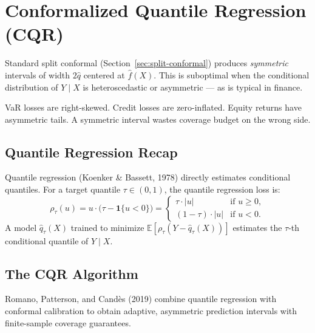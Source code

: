 \documentclass[11pt, a4paper]{article}
\theoremstyle{definition}
\theoremstyle{plain}
\theoremstyle{remark}
\newcommand{\EV}{\mathbb{E}}
\newcommand{\ind}{\boldsymbol{1}}
\begin{document}
\section{Conformalized Quantile Regression (CQR)}
\label{sec:cqr}

Standard split conformal (Section~\ref{sec:split-conformal}) produces
\emph{symmetric} intervals of width $2\hat{q}$ centered at $\hat{f}(X)$.
This is suboptimal when the conditional distribution of $Y \mid X$ is
heteroscedastic or asymmetric --- as is typical in finance.

VaR losses are right-skewed.
Credit losses are zero-inflated.
Equity returns have asymmetric tails.
A symmetric interval wastes coverage budget on the wrong side.

\subsection{Quantile Regression Recap}

Quantile regression (Koenker \& Bassett, 1978) directly estimates conditional
quantiles.
For a target quantile $\tau \in (0,1)$, the quantile regression loss is:
\begin{equation}\label{eq:pinball-loss}
    \rho_\tau(u) = u \cdot \bigl(\tau - \ind\{u < 0\}\bigr)
    = \begin{cases}
        \tau \cdot |u| & \text{if } u \geq 0, \\
        (1 - \tau) \cdot |u| & \text{if } u < 0.
    \end{cases}
\end{equation}
A model $\hat{q}_\tau(X)$ trained to minimize $\EV[\rho_\tau(Y - \hat{q}_\tau(X))]$
estimates the $\tau$-th conditional quantile of $Y \mid X$.

\subsection{The CQR Algorithm}

Romano, Patterson, and Cand\`{e}s (2019) combine quantile regression with
conformal calibration to obtain adaptive, asymmetric prediction intervals
with finite-sample coverage guarantees.
\end{document}
